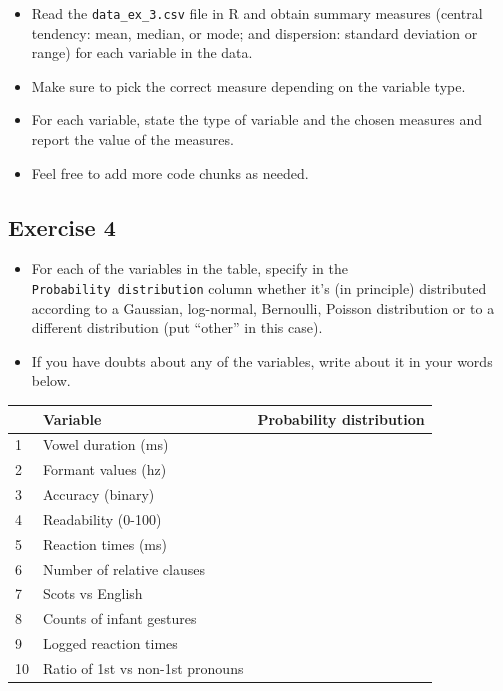 \documentclass[
]{article}
\providecommand{\tightlist}{%
  \setlength{\itemsep}{0pt}\setlength{\parskip}{0pt}}
\begin{document}
\begin{itemize}
\tightlist
\item
  Read the \texttt{data\_ex\_3.csv} file in R and obtain summary
  measures (central tendency: mean, median, or mode; and dispersion:
  standard deviation or range) for each variable in the data.
\item
  Make sure to pick the correct measure depending on the variable type.
\item
  For each variable, state the type of variable and the chosen measures
  and report the value of the measures.
\item
  Feel free to add more code chunks as needed.
\end{itemize}

\hypertarget{exercise-4}{%
\subsection{Exercise 4}\label{exercise-4}}

\begin{itemize}
\tightlist
\item
  For each of the variables in the table, specify in the
  \texttt{Probability\ distribution} column whether it's (in principle)
  distributed according to a Gaussian, log-normal, Bernoulli, Poisson
  distribution or to a different distribution (put ``other'' in this
  case).
\item
  If you have doubts about any of the variables, write about it in your
  words below.
\end{itemize}

\begin{longtable}[]{@{}lll@{}}
\toprule()
& Variable & Probability distribution \\
\midrule()
\endhead
1 & Vowel duration (ms) & \\
2 & Formant values (hz) & \\
3 & Accuracy (binary) & \\
4 & Readability (0-100) & \\
5 & Reaction times (ms) & \\
6 & Number of relative clauses & \\
7 & Scots vs English & \\
8 & Counts of infant gestures & \\
9 & Logged reaction times & \\
10 & Ratio of 1st vs non-1st pronouns & \\
\bottomrule()
\end{longtable}
\end{document}
